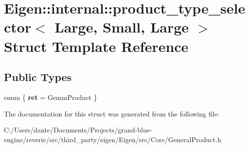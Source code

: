 \hypertarget{struct_eigen_1_1internal_1_1product__type__selector_3_01_large_00_01_small_00_01_large_01_4}{}\section{Eigen\+::internal\+::product\+\_\+type\+\_\+selector$<$ Large, Small, Large $>$ Struct Template Reference}
\label{struct_eigen_1_1internal_1_1product__type__selector_3_01_large_00_01_small_00_01_large_01_4}
\subsection*{Public Types}
\begin{DoxyCompactItemize}
\item 
\mbox{\label{struct_eigen_1_1internal_1_1product__type__selector_3_01_large_00_01_small_00_01_large_01_4_a4e64149be71f5bf33db3a84a2897f1c5}} 
enum \{ {\bfseries ret} = Gemm\+Product
 \}
\end{DoxyCompactItemize}


The documentation for this struct was generated from the following file\+:\begin{DoxyCompactItemize}
\item 
C\+:/\+Users/dante/\+Documents/\+Projects/grand-\/blue-\/engine/reverie/src/third\+\_\+party/eigen/\+Eigen/src/\+Core/General\+Product.\+h\end{DoxyCompactItemize}
